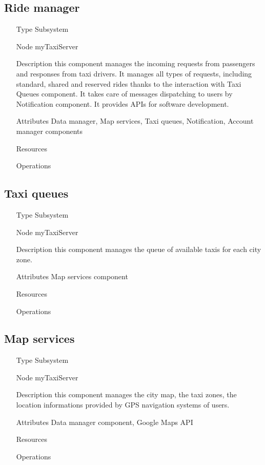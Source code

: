 \subsection{Ride manager}
\begin{itemize}
	\item[Type] Subsystem
	\item[Node] myTaxiServer
	\item[Description] this component manages the incoming requests from passengers and responses from taxi drivers. It manages all types of requests, including standard, shared and reserved rides thanks to the interaction with Taxi Queues component. It takes care of messages dispatching to users by Notification component. It provides APIs for software development.
	\item[Attributes] Data manager, Map services, Taxi queues, Notification, Account manager components
	\item[Resources] 
	\item[Operations]\begin{itemize}
		
	\end{itemize}
\end{itemize}

\subsection{Taxi queues}
\begin{itemize}
	\item[Type] Subsystem
	\item[Node] myTaxiServer
	\item[Description] this component manages the queue of available taxis for each city zone.
	\item[Attributes] Map services component
	\item[Resources]
	\item[Operations] \begin{itemize}
		
	\end{itemize}
\end{itemize}

\subsection{Map services}
\begin{itemize}
	\item[Type] Subsystem
	\item[Node] myTaxiServer
	\item[Description] this component manages the city map, the taxi zones, the location informations provided by GPS navigation systems of users.
	\item[Attributes] Data manager component, Google Maps API
	\item[Resources] 
	\item[Operations]\begin{itemize}
		
	\end{itemize}
\end{itemize}

